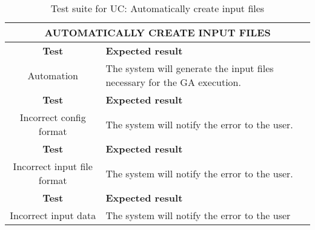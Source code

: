\begin{table}[H]
    \centering
    \caption{Test suite for UC: Automatically create input files}
    \label{uc-table-assignments}
    \begin{tabular}{|c|p{8cm}|}
        \hline
        \multicolumn{2}{|c|}{\textbf{AUTOMATICALLY CREATE INPUT FILES}} \\
        \hline
        \rowcolor{blue!10}
        \textbf{Test} & \textbf{Expected result} \\
        \rowcolor{blue!30}
        Automation & The system will generate the input files necessary for the GA execution. \\
        \rowcolor{blue!10}
        \textbf{Test} & \textbf{Expected result} \\
        \rowcolor{blue!30}
        Incorrect config format & The system will notify the error to the user. \\
        \rowcolor{blue!10}
        \textbf{Test} & \textbf{Expected result} \\
        \rowcolor{blue!30}
        Incorrect input file format & The system will notify the error to the user. \\
        \rowcolor{blue!10}
        \textbf{Test} & \textbf{Expected result} \\
        \rowcolor{blue!30}
        Incorrect input data & The system will notify the error to the user \\
        \hline
    \end{tabular}
\end{table}

